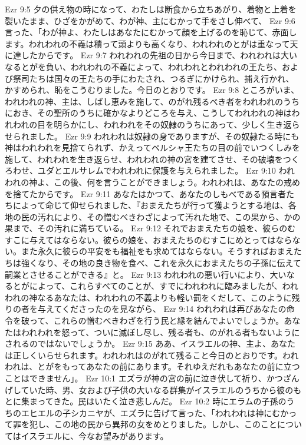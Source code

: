 Ezr 9:5  夕の供え物の時になって、わたしは断食から立ちあがり、着物と上着を裂いたまま、ひざをかがめて、わが神、主にむかって手をさし伸べて、
Ezr 9:6  言った、「わが神よ、わたしはあなたにむかって顔を上げるのを恥じて、赤面します。われわれの不義は積って頭よりも高くなり、われわれのとがは重なって天に達したからです。
Ezr 9:7  われわれの先祖の日から今日まで、われわれは大いなるとがを負い、われわれの不義によって、われわれとわれわれの王たち、および祭司たちは国々の王たちの手にわたされ、つるぎにかけられ、捕え行かれ、かすめられ、恥をこうむりました。今日のとおりです。
Ezr 9:8  ところがいま、われわれの神、主は、しばし恵みを施して、のがれ残るべき者をわれわれのうちにおき、その聖所のうちに確かなよりどころを与え、こうしてわれわれの神はわれわれの目を明らかにし、われわれをその奴隷のうちにあって、少しく生き返らせられました。
Ezr 9:9  われわれは奴隷の身でありますが、その奴隷たる時にも神はわれわれを見捨てられず、かえってペルシャ王たちの目の前でいつくしみを施して、われわれを生き返らせ、われわれの神の宮を建てさせ、その破壊をつくろわせ、ユダとエルサレムでわれわれに保護を与えられました。
Ezr 9:10  われわれの神よ、この後、何を言うことができましょう。われわれは、あなたの戒めを捨てたからです。
Ezr 9:11  あなたはかつて、あなたのしもべである預言者たちによって命じて仰せられました、『おまえたちが行って獲ようとする地は、各地の民の汚れにより、その憎むべきわざによって汚れた地で、この果から、かの果まで、その汚れに満ちている。
Ezr 9:12  それでおまえたちの娘を、彼らのむすこに与えてはならない。彼らの娘を、おまえたちのむすこにめとってはならない。また永久に彼らの平安をも福祉をも求めてはならない。そうすればおまえたちは強くなり、その地の良き物を食べ、これを永久におまえたちの子孫に伝えて嗣業とさせることができる』と。
Ezr 9:13  われわれの悪い行いにより、大いなるとがによって、これらすべてのことが、すでにわれわれに臨みましたが、われわれの神なるあなたは、われわれの不義よりも軽い罰をくだして、このように残りの者を与えてくださったのを見ながら、
Ezr 9:14  われわれは再びあなたの命令を破って、これらの憎むべきわざを行う民と縁を結んでよいでしょうか。あなたはわれわれを怒って、ついに滅ぼし尽し、残る者も、のがれる者もないようにされるのではないでしょうか。
Ezr 9:15  ああ、イスラエルの神、主よ、あなたは正しくいらせられます。われわれはのがれて残ること今日のとおりです。われわれは、とがをもってあなたの前にあります。それゆえだれもあなたの前に立つことはできません」。
Ezr 10:1  エズラが神の宮の前に泣き伏して祈り、かつざんげしていた時、男、女および子供の大いなる群集がイスラエルのうちから彼のもとに集まってきた。民はいたく泣き悲しんだ。
Ezr 10:2  時にエラムの子孫のうちのエヒエルの子シカニヤが、エズラに告げて言った、「われわれは神にむかって罪を犯し、この地の民から異邦の女をめとりました。しかし、このことについてはイスラエルに、今なお望みがあります。
